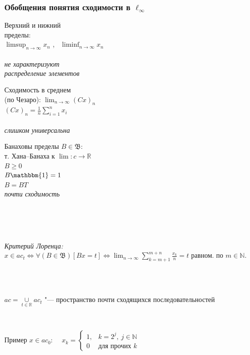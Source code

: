 \documentclass[10pt,pdf,hyperref={unicode},aspectratio=169,color={usenames, dvipsnames}]{beamer}
\theoremstyle{definition}
\begin{document}
\begin{frame}
	\frametitle{Обобщения понятия сходимости в $\ell_\infty$}
	\begin{varwidth}[t]{\linewidth}
		\centering
		Верхний и нижний
		\\
		пределы:
		\\
		$\displaystyle \limsup_{n\to\infty} x_n$
		,~
		$\displaystyle \liminf_{n\to\infty} x_n$
		\\~\\
		\emph{
			не характеризуют
			\\
			распределение элементов
		}
	\end{varwidth}
	\hfill
	\begin{varwidth}[t]{\linewidth}
		\centering
		Сходимость в среднем
		\\
		(по Чезаро):
		$\displaystyle \lim_{n\to\infty} (Cx)_n$
		\\
		$\displaystyle (Cx)_n = \frac1n\sum_{i=1}^n x_i$
		\\~\\
		\emph{слишком универсальна}
	\end{varwidth}
	\hfill
	\begin{varwidth}[t]{\linewidth}
		\centering
		Банаховы пределы $B\in \mathfrak{B}$:
		\\
		т. Хана--Банаха к $\lim: c\to\mathbb R$
		\\
			$B \geqslant 0$
		\\
			$B\mathbbm{1} = 1$
		\\
			$B=BT$
		\\
		\emph{почти сходимость}
	\end{varwidth}
	\\~\\~\\
	\begin{varwidth}[t]{\linewidth}
		\centering
		\emph{Критерий Лоренца:}
		$\displaystyle
			x\in ac_t
			\Leftrightarrow
			\forall(B\in\mathfrak{B})[Bx = t]
			\Leftrightarrow
			\lim_{n\to\infty}  \sum_{k=m+1}^{m+n} \frac{x_k}n = t
		$
		равном. по $m\in\mathbb{N}$.
	\end{varwidth}
	\\~\\
	\vspace{1em}
	\begin{varwidth}[t]{\linewidth}
		$\displaystyle ac = \mathop{\cup}\limits_{t\in\mathbb R} ac_t$ "--- пространство почти сходящихся последовательностей
	\end{varwidth}
	\\
	\vspace{1em}
	\begin{varwidth}[t]{\linewidth}
		Пример $x\in ac_0$:~~
		$\displaystyle
			x_k=\begin{cases}
				1, & k=2^j,~j\in\mathbb N
				\\
				0 & \mbox{для прочих~} k
			\end{cases}
		$
	\end{varwidth}
\end{frame}
\end{document}
